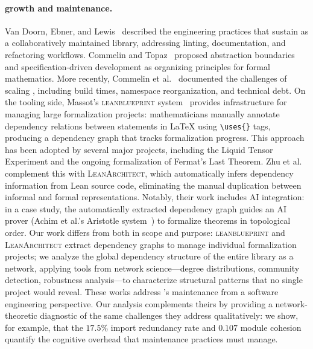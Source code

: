 \paragraph{ growth and maintenance.}
Van Doorn, Ebner, and Lewis~\cite{vandoorn2020} described the engineering practices that sustain  as a collaboratively maintained library, addressing linting, documentation, and refactoring workflows. Commelin and Topaz~\cite{commelin2023} proposed abstraction boundaries and specification-driven development as organizing principles for formal mathematics. More recently, Commelin et al.~\cite{baanen2025} documented the challenges of scaling , including build times, namespace reorganization, and technical debt. On the tooling side, Massot's \textsc{leanblueprint} system~\cite{massot2020leanblueprint} provides infrastructure for managing large formalization projects: mathematicians manually annotate dependency relations between statements in \LaTeX{} using \verb|\uses{}| tags, producing a dependency graph that tracks formalization progress. This approach has been adopted by several major projects, including the Liquid Tensor Experiment and the ongoing formalization of Fermat's Last Theorem. Zhu et al.~\cite{zhu2025leanarchitect} complement this with \textsc{LeanArchitect}, which automatically infers dependency information from Lean source code, eliminating the manual duplication between informal and formal representations. Notably, their work includes AI integration: in a case study, the automatically extracted dependency graph guides an AI prover (Achim et al.'s Aristotle system~\cite{achim2025aristotle}) to formalize theorems in topological order. Our work differs from both in scope and purpose: \textsc{leanblueprint} and \textsc{LeanArchitect} extract dependency graphs to manage individual formalization projects; we analyze the global dependency structure of the entire  library as a network, applying tools from network science---degree distributions, community detection, robustness analysis---to characterize structural patterns that no single project would reveal. These works address 's maintenance from a software engineering perspective. Our analysis complements theirs by providing a network-theoretic diagnostic of the same challenges they address qualitatively: we show, for example, that the $17.5\%$ import redundancy rate and $0.107$ module cohesion quantify the cognitive overhead that maintenance practices must manage.

